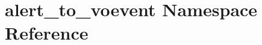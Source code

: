 \hypertarget{namespacealert__to__voevent}{\section{alert\-\_\-to\-\_\-voevent Namespace Reference}
\label{namespacealert__to__voevent}
}
